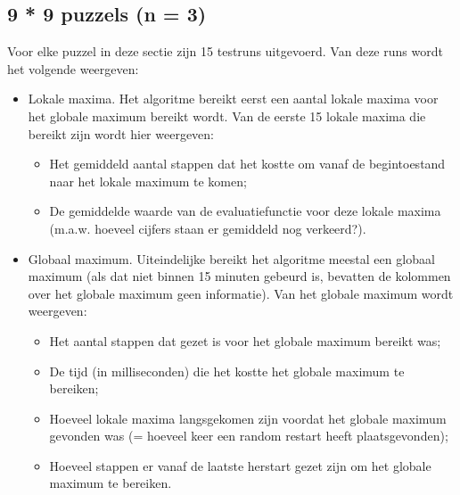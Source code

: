 \documentclass[]{report}
\begin{document}
\begin{appendices}
\section{9 * 9 puzzels (n = 3)}
Voor elke puzzel in deze sectie zijn 15 testruns uitgevoerd. Van deze runs wordt het volgende weergeven:
\begin{itemize}
\item Lokale maxima. Het algoritme bereikt eerst een aantal lokale maxima voor het globale maximum bereikt wordt. Van de eerste 15 lokale maxima die bereikt zijn wordt hier weergeven:
\begin{itemize}
\item Het gemiddeld aantal stappen dat het kostte om vanaf de begintoestand naar het lokale maximum te komen;
\item De gemiddelde waarde van de evaluatiefunctie voor deze lokale maxima (m.a.w. hoeveel cijfers staan er gemiddeld nog verkeerd?).
\end{itemize}
\item Globaal maximum. Uiteindelijke bereikt het algoritme meestal een globaal maximum (als dat niet binnen 15 minuten gebeurd is, bevatten de kolommen over het globale maximum geen informatie). Van het globale maximum wordt weergeven:
\begin{itemize}
\item Het aantal stappen dat gezet is voor het globale maximum bereikt was;
\item De tijd (in milliseconden) die het kostte het globale maximum te bereiken;
\item Hoeveel lokale maxima langsgekomen zijn voordat het globale maximum gevonden was (= hoeveel keer een random restart heeft plaatsgevonden);
\item Hoeveel stappen er vanaf de laatste herstart gezet zijn om het globale maximum te bereiken.
\end{itemize}
\end{itemize}

\end{appendices}
\end{document}
